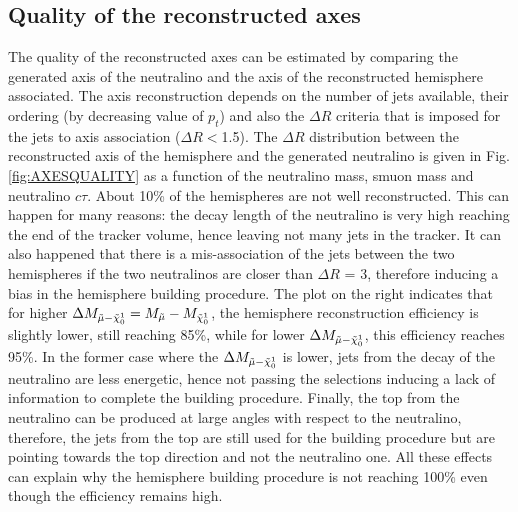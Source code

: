 \documentclass{cernatlasnote}
\begin{document}
\subsection{Quality of the reconstructed axes}

    The quality of the reconstructed axes can be estimated by comparing the generated axis of the neutralino and the axis of the reconstructed hemisphere associated. The axis reconstruction depends on the number of jets available, their ordering (by decreasing value of $p_t$) and also the $\Delta R$ criteria that is imposed for the jets to axis association ($\Delta R <$1.5).
    The $\Delta R$ distribution between the reconstructed axis of the hemisphere and the generated neutralino is given in Fig. \ref{fig:AXESQUALITY} as a function of the neutralino mass, smuon mass and neutralino $c\tau$. About 10\% of the hemispheres are not well reconstructed. This can happen for many reasons: the decay length of the neutralino is very high reaching the end of the tracker volume, hence leaving not many jets in the tracker. It can also happened that there is a mis-association of the jets between the two hemispheres if the two neutralinos are closer than $\Delta R $ = 3, therefore inducing a bias in the hemisphere building procedure. The plot on the right indicates that for higher $\Delta M_{\Tilde{\mu}-\Tilde{\chi}^{1}_{0}} = M_{\Tilde{\mu}} - M_{\Tilde{\chi}^{1}_{0}}$, the hemisphere reconstruction efficiency is slightly lower, still reaching 85\%, while for lower $\Delta M_{\Tilde{\mu}-\Tilde{\chi}^{1}_{0}}$, this efficiency reaches 95\%. In the former case where the $\Delta M_{\Tilde{\mu}-\Tilde{\chi}^{1}_{0}}$ is lower, jets from the decay of the neutralino are less energetic, hence not passing the selections inducing a lack of information to complete the building procedure. Finally, the top from the neutralino can be produced at large angles with respect to the neutralino, therefore, the jets from the top are still used for the building procedure but are pointing towards the top direction and not the neutralino one. All these effects can explain why the hemisphere building procedure is not reaching 100\% even though the efficiency remains high.
\end{document}
